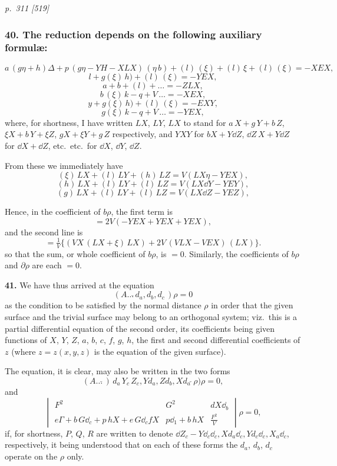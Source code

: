 \documentclass[11pt,a4paper]{book}
\begin{document}
\clearpage

\bigskip
\textit{p.~311 [519]}
\smallskip

\subsubsection*{40. The reduction depends on the following auxiliary formul\ae{}:}
\[
a\,(g\eta + h)\Delta + p\,(g\eta - YH - XLX)\,(\eta\,b) + (l)\,(\xi) + (l)\,\xi + (l)\,(\xi) = -XEX,
\]
\[
l + g(\xi)\,h\bigr) + (l)\,(\xi) = -YEX,
\]
\[
a + b + (l) + \ldots = -ZLX,
\]
\[
b\,(\xi)\,k - q + V\,\ldots = -XEX,
\]
\[
y + g(\xi)\,h\bigr) + (l)\,(\xi) = -EXY,
\]
\[
g(\xi)\,k - q + V\,\ldots = -YEX,
\]
where, for shortness, I have written $LX$, $LY$, $LX$ to stand for $a\,X + g\,Y + b\,Z$, $\xi X + b\,Y + \xi Z$, $g X + \xi Y + g\,Z$ respectively, and $YXY$ for $b X + Y\dd Z$, $\dd Z\,X + Y\dd Z$ for $\dd X + \dd Z$, etc.\ etc.\ for $\dd X$, $\dd Y$, $\dd Z$.

From these we immediately have
\[
(\xi)\,LX + (l)\,LY + (h)\,LZ = V(LX\eta - YEX),
\]
\[
(h)\,LX + (l)\,LY + (l)\,LZ = V(LX\dd Y - YEY),
\]
\[
(g)\,LX + (l)\,LY + (l)\,LZ = V(LX\dd Z - YEZ),
\]

Hence, in the coefficient of $b\rho$, the first term is
\[
= 2 V(-YEX + YEX + YEX),
\]
and the second line is
\[
= \tfrac{1}{V}\{(VX\,(LX + \xi)\,LX) + 2V\,(VLX - VEX)\,(LX)\}.
\]
so that the sum, or whole coefficient of $b\rho$, is $= 0$. Similarly, the coefficients of $b\rho$ and $\partial\rho$ are each $= 0$.

\textbf{41.} We have thus arrived at the equation
\[
(A\ldots\check{}\,d_{a}, d_{b}, d_{c}\,)\rho = 0
\]
as the condition to be satisfied by the normal distance $\rho$ in order that the given surface and the trivial surface may belong to an orthogonal system; viz.\ this is a partial differential equation of the second order, its coefficients being given functions of $X$, $Y$, $Z$, $a$, $b$, $c$, $f$, $g$, $h$, the first and second differential coefficients of $z$ (where $z = z(x, y, z)$ is the equation of the given surface).

The equation, it is clear, may also be written in the two forms
\[
(A\ldots\check{}\,)\,d_{a}\,Y_{c}\,Z_{c}, Yd_{a}, Zd_{b}, Xd_{a}\,\check{}\,\rho)\rho = 0,
\]
and
\[
\begin{vmatrix}
F^2 & G^2 & d X\dd_{b} \\
e\Gamma + b\,G\dd_{c} + p\,h X + e\,G\dd_{c} f X & p\dd_{1} + b\,h X & \tfrac{F^2}{V}
\end{vmatrix}\rho = 0,
\]
if, for shortness, $P$, $Q$, $R$ are written to denote $\dd Z_{c} - Y\dd_{c}\dd_{c}, Xd_{a}\dd_{c}, Yd_{c}\dd_{c}, X_{a}\dd_{c}$, respectively, it being understood that on each of these forms the $d_{a}$, $d_{b}$, $d_{c}$ operate on the $\rho$ only.
\end{document}
